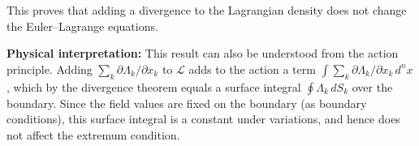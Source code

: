 \documentclass[12pt]{article}
\begin{document}
This proves that adding a divergence to the Lagrangian density does not change the Euler--Lagrange equations.

\medskip
\noindent\textbf{Physical interpretation:} This result can also be understood from the action principle. Adding $\sum_k \partial\Lambda_k/\partial x_k$ to $\mathscr{L}$ adds to the action a term $\int \sum_k \partial\Lambda_k/\partial x_k\,d^n x$, which by the divergence theorem equals a surface integral $\oint \Lambda_k\,dS_k$ over the boundary. Since the field values are fixed on the boundary (as boundary conditions), this surface integral is a constant under variations, and hence does not affect the extremum condition.
\end{document}
